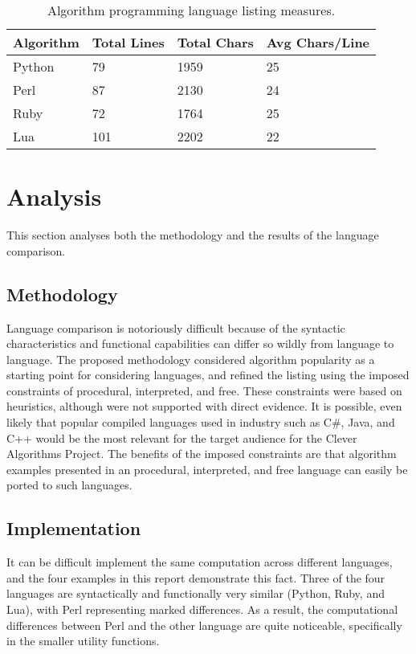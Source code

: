 \documentclass[a4paper, 11pt]{article}
\begin{document}
\begin{table}[ht]
	\centering
		\begin{tabularx}{\textwidth}{lXXX}
		\toprule
		\textbf{Algorithm} & \textbf{Total Lines} & \textbf{Total Chars} & \textbf{Avg Chars/Line} \\ 
		\toprule
		Python & 79 & 1959 & 25 \\
		Perl & 87 & 2130 & 24 \\		
		Ruby & 72 & 1764 & 25 \\
		Lua & 101 & 2202 & 22 \\
		\bottomrule
		\end{tabularx}	
	\caption{Algorithm programming language listing measures.}
	\label{tab:implementation_results}
\end{table}

% 
% 
\section{Analysis}
\label{sec:analysis}
This section analyses both the methodology and the results of the language comparison.

% 
% 
\subsection{Methodology}
Language comparison is notoriously difficult because of the syntactic characteristics and functional capabilities can differ so wildly from language to language. 
The proposed methodology considered algorithm popularity as a starting point for considering languages, and refined the listing using the imposed constraints of procedural, interpreted, and free. These constraints were based on heuristics, although were not supported with direct evidence. 
It is possible, even likely that popular compiled languages used in industry such as C\#, Java, and C++ would be the most relevant for the target audience for the Clever Algorithms Project. 
The benefits of the imposed constraints are that algorithm examples presented in an procedural, interpreted, and free language can easily be ported to such languages.


% 
% 
\subsection{Implementation}
It can be difficult implement the same computation across different languages, and the four examples in this report demonstrate this fact. 
Three of the four languages are syntactically and functionally very similar (Python, Ruby, and Lua), with Perl representing marked differences. As a result, the computational differences between Perl and the other language are quite noticeable, specifically in the smaller utility functions.
\end{document}
